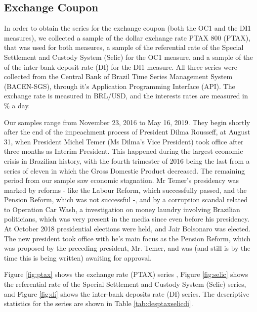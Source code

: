 \documentclass[cic,tc, english]{iiufrgs}
\begin{document}
\subsection{Exchange Coupon} \label{chapter_exchange_coupon}

    In order to obtain the series for the exchange coupon (both the OC1 and the DI1 measures), we collected a sample of the dollar exchange rate PTAX 800 (PTAX), that was used for both measures, a sample of the referential rate of the Special Settlement and Custody System (Selic) for the OC1 measure, and a sample of the of the inter-bank deposit rate (DI) for the DI1 measure. All three series were collected from the Central Bank of Brazil Time Series Management System (BACEN-SGS), through it's Application Programming Interface (API). The exchange rate is measured in BRL/USD, and the interests rates are measured in \% a day.
    
    Our samples range from November 23, 2016 to May 16, 2019. They begin shortly after the end of the impeachment process of President Dilma Rousseff, at August 31, when President Michel Temer (Ms Dilma's Vice President) took office after three months as Interim President. This happened during the largest economic crisis in Brazilian history, with the fourth trimester of 2016 being the last from a series of eleven in which the Gross Domestic Product decreased. The remaining period from our sample saw economic stagnation. Mr Temer's presidency was marked by reforms - like the Labour Reform, which successfully passed, and the Pension Reform, which was not successful -, and by a corruption scandal related to Operation Car Wash, a investigation on money laundry involving Brazilian politicians, which was very present in the media since even before his presidency. At October 2018 presidential elections were held, and Jair Bolsonaro was elected. The new president took office with he's main focus as the Pension Reform, which was proposed by the preceding president, Mr. Temer, and was (and still is by the time this is being written) awaiting for approval.
    

    Figure \ref{fig:ptax} shows the exchange rate (PTAX) series , Figure \ref{fig:selic} shows the referential rate of the Special Settlement and Custody System (Selic) series, and Figure \ref{fig:di} shows the inter-bank deposits rate (DI) series. The descriptive statistics for the series are shown in Table \ref{tab:desptaxselicdi}.

    
\end{document}
